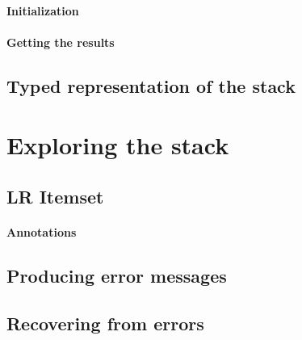 \documentclass[twoside,a4paper]{article}
\begin{document}




% 
\paragraph{Initialization}

\paragraph{Getting the results}

\subsection{Typed representation of the stack}

\section{Exploring the stack}

\subsection{LR Itemset}

\paragraph{Annotations}

\subsection{Producing error messages}

\subsection{Recovering from errors}
\end{document}
